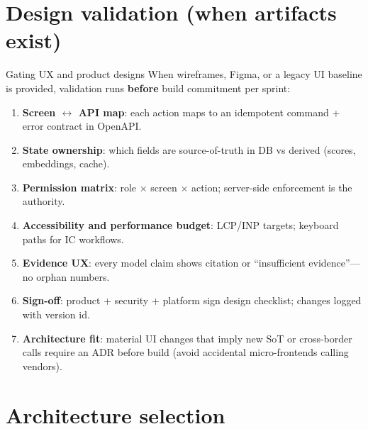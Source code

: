 \documentclass[aspectratio=169,11pt]{beamer}
\begin{document}
\section{Design validation (when artifacts exist)}

\begin{frame}{Gating UX and product designs}
  \small
  When wireframes, Figma, or a legacy UI baseline is provided, validation runs \textbf{before} build commitment per sprint:

  \begin{enumerate}\itemsep3pt
    \item \textbf{Screen $\leftrightarrow$ API map}: each action maps to an idempotent command + error contract in OpenAPI.
    \item \textbf{State ownership}: which fields are source-of-truth in DB vs derived (scores, embeddings, cache).
    \item \textbf{Permission matrix}: role $\times$ screen $\times$ action; server-side enforcement is the authority.
    \item \textbf{Accessibility and performance budget}: LCP/INP targets; keyboard paths for IC workflows.
    \item \textbf{Evidence UX}: every model claim shows citation or ``insufficient evidence''---no orphan numbers.
    \item \textbf{Sign-off}: product + security + platform sign design checklist; changes logged with version id.
    \item \textbf{Architecture fit}: material UI changes that imply new SoT or cross-border calls require an ADR before build (avoid accidental micro-frontends calling vendors).
  \end{enumerate}
\end{frame}

\section{Architecture selection}
\end{document}
